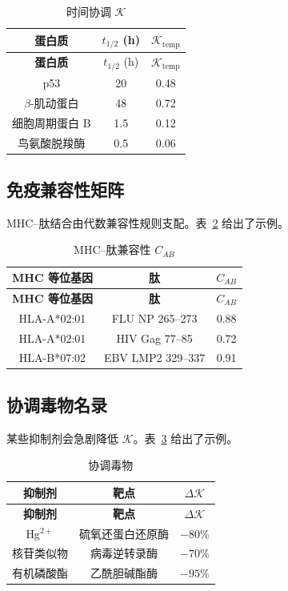 \documentclass[12pt,a4paper]{article}
\newcommand{\REL}{\mathcal{K}}          %
\begin{document}
	\begin{longtable}{|c|c|c|}
		\caption{时间协调 \(\REL\)}\label{tab:temporal}\\
		\hline
		\textbf{蛋白质} & \(t_{1/2}\) (h) & \(\REL_{\mathrm{temp}}\) \\
		\hline
		\endfirsthead
		\hline
		\textbf{蛋白质} & \(t_{1/2}\) (h) & \(\REL_{\mathrm{temp}}\) \\
		\hline
		\endhead
		\hline
		p53 & 20 & 0.48 \\
		\(\beta\)-肌动蛋白 & 48 & 0.72 \\
		细胞周期蛋白 B & 1.5 & 0.12 \\
		鸟氨酸脱羧酶 & 0.5 & 0.06 \\
		\hline
	\end{longtable}
	
	\subsection{免疫兼容性矩阵}
	MHC–肽结合由代数兼容性规则支配。表~\ref{tab:mhc} 给出了示例。
	
	\begin{longtable}{|c|c|c|}
		\caption{MHC–肽兼容性 \(C_{AB}\)}\label{tab:mhc}\\
		\hline
		\textbf{MHC 等位基因} & \textbf{肽} & \(C_{AB}\) \\
		\hline
		\endfirsthead
		\hline
		\textbf{MHC 等位基因} & \textbf{肽} & \(C_{AB}\) \\
		\hline
		\endhead
		\hline
		HLA-A*02:01 & FLU NP 265–273 & 0.88 \\
		HLA-A*02:01 & HIV Gag 77–85 & 0.72 \\
		HLA-B*07:02 & EBV LMP2 329–337 & 0.91 \\
		\hline
	\end{longtable}
	
	\subsection{协调毒物名录}
	某些抑制剂会急剧降低 \(\REL\)。表~\ref{tab:poisons} 给出了示例。
	
	\begin{longtable}{|c|c|c|}
		\caption{协调毒物}\label{tab:poisons}\\
		\hline
		\textbf{抑制剂} & \textbf{靶点} & \(\Delta \REL\) \\
		\hline
		\endfirsthead
		\hline
		\textbf{抑制剂} & \textbf{靶点} & \(\Delta \REL\) \\
		\hline
		\endhead
		\hline
		Hg\(^{2+}\) & 硫氧还蛋白还原酶 & \(-80\%\) \\
		核苷类似物 & 病毒逆转录酶 & \(-70\%\) \\
		有机磷酸酯 & 乙酰胆碱酯酶 & \(-95\%\) \\
		\hline
	\end{longtable}
	
\end{document}
